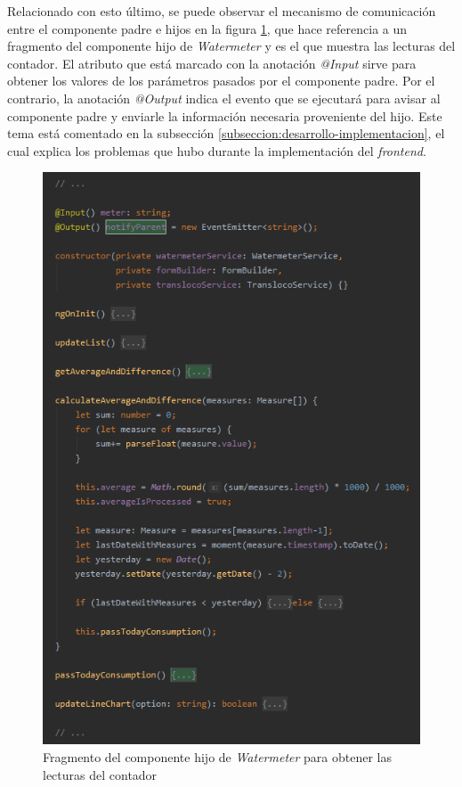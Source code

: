 \documentclass[pdftex,11pt,a4paper]{book}
\begin{document}
Relacionado con esto último, se puede observar el mecanismo de comunicación entre el componente padre e hijos en la figura \ref{fig:measures-ts}, que hace referencia a un fragmento del componente hijo de \textit{Watermeter} y es el que muestra las lecturas del contador. El atributo que está marcado con la anotación \textit{@Input} sirve para obtener los valores de los parámetros pasados por el componente padre. Por el contrario, la anotación \textit{@Output} indica el evento que se ejecutará para avisar al componente padre y enviarle la información necesaria proveniente del hijo. Este tema está comentado en la subsección \ref{subseccion:desarrollo-implementacion}, el cual explica los problemas que hubo durante la implementación del \textit{frontend}.

 \begin{figure}[H]
 \centering
 \includegraphics [scale=0.73] {images/implementacion/measures-ts.png}
 \caption{Fragmento del componente hijo de \textit{Watermeter} para obtener las lecturas del contador} \label{fig:measures-ts}
 \end{figure}
\end{document}
